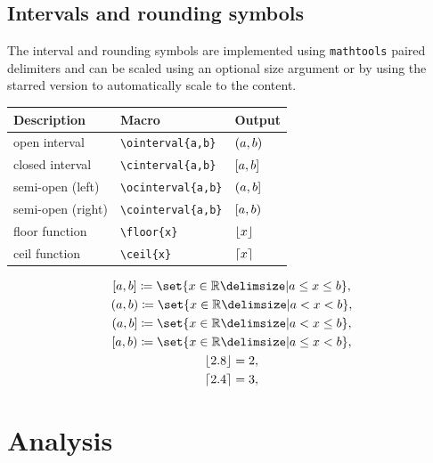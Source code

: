 \documentclass[DIV=13]{scrartcl}
\begin{document}
\subsection{Intervals and rounding symbols}
The interval and rounding symbols are implemented using \texttt{mathtools}
paired delimiters and can be scaled using an optional size argument or by
using the starred version to automatically scale to the content.
\begin{center}
  \begin{tabular}{lll}
    \toprule
    \textbf{Description} & \textbf{Macro}          & \textbf{Output}    \\
    \midrule
    open interval        & \verb|\ointerval{a,b}|  & $\lparen a,b\rparen$  \\
    closed interval      & \verb|\cinterval{a,b}|  & $\lbrack a,b\rbrack$  \\
    semi-open (left)     & \verb|\ocinterval{a,b}| & $\lparen a,b\rbrack$ \\
    semi-open (right)    & \verb|\cointerval{a,b}| & $\lbrack a,b\rparen$ \\
    \midrule
    floor function       & \verb|\floor{x}|        & $\lfloor x\rfloor$        \\
    ceil function        & \verb|\ceil{x}|         & $\lceil x\rceil$         \\
    \bottomrule
  \end{tabular}
\end{center}
\begin{gather}
  \cinterval{a,b} \coloneq \set{x \in \Rnums \given a \leq x \leq b}, \\
  \ointerval{a,b} \coloneq \set{x \in \Rnums \given a < x < b}, \\
  \ocinterval{a,b} \coloneq \set{x \in \Rnums \given a < x \leq b}, \\
  \cointerval{a,b} \coloneq \set{x \in \Rnums \given a \leq x < b}, \\
  \floor{2.8} = 2, \\
  \ceil{2.4} = 3, \\
\end{gather}


\section{Analysis}
\end{document}
